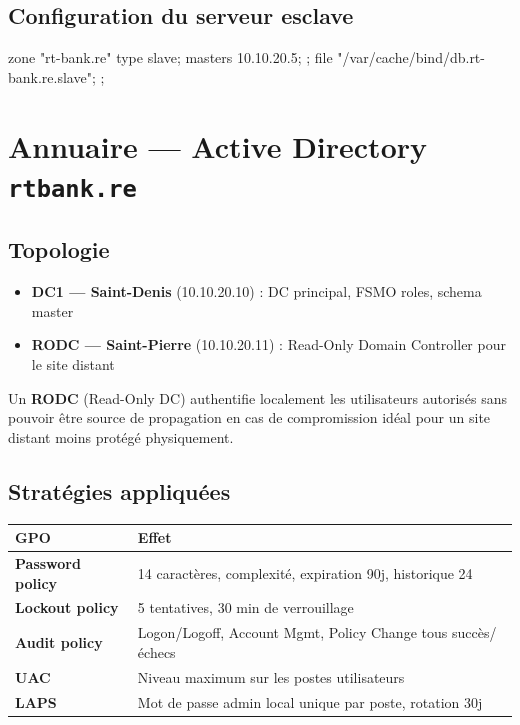 \documentclass[11pt,a4paper]{article}
\begin{document}
\subsection{Configuration du serveur esclave}

\begin{cfgbox}
zone "rt-bank.re" {
    type slave;
    masters { 10.10.20.5; };
    file "/var/cache/bind/db.rt-bank.re.slave";
};
\end{cfgbox}

\section{Annuaire — Active Directory \texttt{rtbank.re}}

\subsection{Topologie}

\begin{secbox}[title={\faNetworkWired~Réplication AD}]
\begin{itemize}
  \item \textbf{DC1 — Saint-Denis} (10.10.20.10) : DC principal, FSMO roles, schema master
  \item \textbf{RODC — Saint-Pierre} (10.10.20.11) : Read-Only Domain Controller pour le site distant
\end{itemize}
\end{secbox}

Un \textbf{RODC} (Read-Only DC) authentifie localement les utilisateurs autorisés sans pouvoir être source de propagation en cas de compromission \textemdash{} idéal pour un site distant moins protégé physiquement.

\subsection{Stratégies appliquées}

\renewcommand{\arraystretch}{1.3}
\begin{tabularx}{\linewidth}{@{}>{\bfseries}l X@{}}
\toprule
\rowcolor{light} GPO & Effet \\ \midrule
Password policy   & 14 caractères, complexité, expiration 90j, historique 24 \\
Lockout policy    & 5 tentatives, 30 min de verrouillage \\
Audit policy      & Logon/Logoff, Account Mgmt, Policy Change \textemdash{} tous succès/échecs \\
UAC               & Niveau maximum sur les postes utilisateurs \\
LAPS              & Mot de passe admin local unique par poste, rotation 30j \\
\bottomrule
\end{tabularx}
\end{document}
